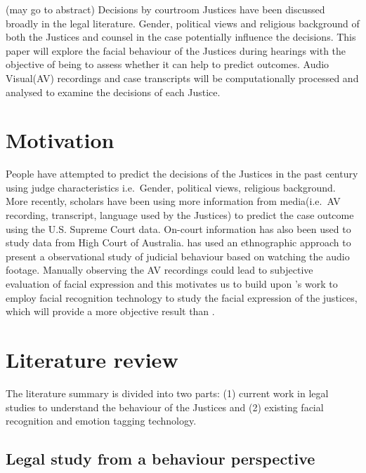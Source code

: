 \documentclass{monashthesis}
\begin{document}
(may go to abstract)
Decisions by courtroom Justices have been discussed broadly in the legal literature. Gender, political views and religious background of both the Justices and counsel in the case potentially influence the decisions. This paper will explore the facial behaviour of the Justices during hearings with the objective of being to assess whether it can help to predict outcomes. Audio Visual(AV) recordings and case transcripts will be computationally processed and analysed to examine the decisions of each Justice.

\hypertarget{motivation}{%
\section{Motivation}\label{motivation}}

People have attempted to predict the decisions of the Justices in the past century using judge characteristics i.e.~Gender, political views, religious background. More recently, scholars\autocites{Shullman2004illusion}{chen2018justice} have been using more information from media(i.e.~AV recording, transcript, language used by the Justices) to predict the case outcome using the U.S. Supreme Court data. On-court information has also been used to study data from High Court of Australia. \textcite{tutton2018judicial} has used an ethnographic approach to present a observational study of judicial behaviour based on watching the audio footage. Manually observing the AV recordings could lead to subjective evaluation of facial expression and this motivates us to build upon \textcite{tutton2018judicial}'s work to employ facial recognition technology to study the facial expression of the justices, which will provide a more objective result than \textcite{tutton2018judicial}.

\hypertarget{literature-review}{%
\section{Literature review}\label{literature-review}}

The literature summary is divided into two parts: (1) current work in legal studies to understand the behaviour of the Justices and (2) existing facial recognition and emotion tagging technology.

\hypertarget{legal-study-from-a-behaviour-perspective}{%
\subsection{Legal study from a behaviour perspective}\label{legal-study-from-a-behaviour-perspective}}
\end{document}

